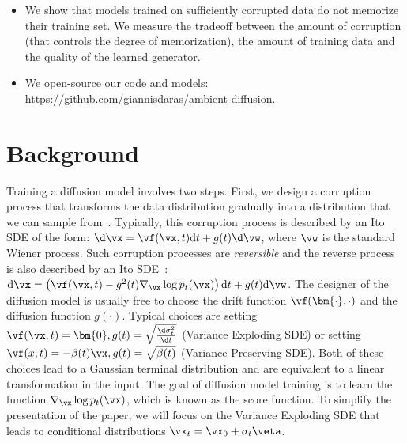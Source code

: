 \documentclass{article}
\begin{document}
\begin{itemize}
        can be done in a few hours on a single GPU and we can use it to learn distributions with a few corrupted samples.
        \item We show that models trained on sufficiently corrupted data do not memorize their training set.  We measure the tradeoff between the amount of corruption (that controls the degree of memorization), the amount of training data and the quality of the learned generator. 
        \item We open-source our code and models: \href{https://github.com/giannisdaras/ambient-diffusion}{https://github.com/giannisdaras/ambient-diffusion}.
\end{itemize}
\section{Background}\label{sec:background}
Training a diffusion model involves two steps. First, we design a corruption process that transforms the data distribution gradually into a distribution that we can sample from~\citep{ncsnv3, daras2023soft}. Typically, this corruption process is described by an Ito SDE of the form:
$\d\vx = \vf(\vx, t)\mathrm{d}t +  g(t)\d\vw$,
where $\vw$ is the standard Wiener process. Such corruption processes are \textit{reversible} and the reverse process is also described by an Ito SDE~\citep{anderson}:
$\mathrm{d}\vx = \left(\vf(\vx, t) -g^2(t)\nabla_{\vx}\log p_t(\vx) \right)\mathrm{d}t + g(t)\mathrm{d}\vw$.
The designer of the diffusion model is usually free to choose the drift function $\vf(\bm{\cdot}, \cdot)$ and the diffusion function $g(\cdot)$. Typical choices are setting $\vf(\vx, t) = \bm{0}, g(t) = \sqrt{\frac{\d \sigma^2_t}{\d t}}$ (Variance Exploding SDE) or setting $\vf(x, t) = -\beta(t)\vx, g(t) = \sqrt{\beta(t)}$ (Variance Preserving SDE). Both of these choices lead to a Gaussian terminal distribution and are equivalent to a linear transformation in the input. 
The goal of diffusion model training is to learn the function $\nabla_{\vx} \log p_t(\vx)$, which is known as the score function. To simplify the presentation of the paper, we will focus on the Variance Exploding SDE that leads to conditional distributions $\vx_t = \vx_0 + \sigma_t\veta$.
\end{document}
